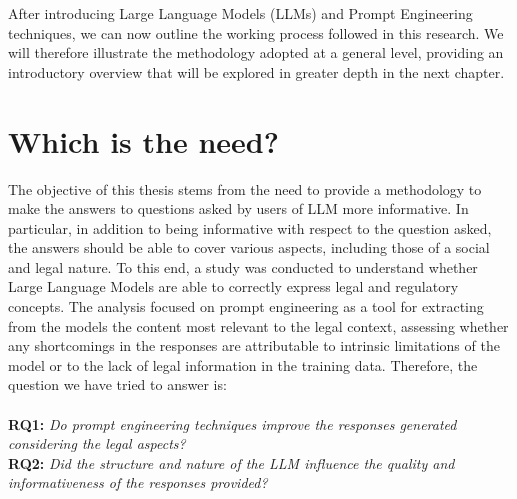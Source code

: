 
After introducing Large Language Models (LLMs) and Prompt Engineering techniques, we can now outline the working process followed in this research. We will therefore illustrate the methodology adopted at a general level, providing an introductory overview that will be explored in greater depth in the next chapter.
\section{Which is the need?}
The objective of this thesis stems from the need to provide a methodology to make the answers to questions asked by users of LLM more informative. In particular, in addition to being informative with respect to the question asked, the answers should be able to cover various aspects, including those of a social and legal nature.
To this end, a study was conducted to understand whether Large Language Models are able to correctly express legal and regulatory concepts. The analysis focused on prompt engineering as a tool for extracting from the models the content most relevant to the legal context, assessing whether any shortcomings in the responses are attributable to intrinsic limitations of the model or to the lack of legal information in the training data.
Therefore, the question we have tried to answer is:\\
\\
\textbf{RQ1: }\textit{Do prompt engineering techniques improve the responses generated considering the legal aspects?}\\
\textbf{RQ2: }\textit{Did the structure and nature of the LLM influence the quality and informativeness of the responses provided?}\\
